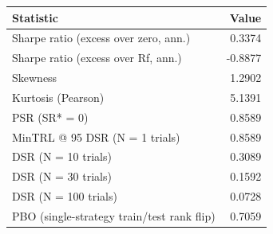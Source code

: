 \begin{tabular}{lr}
\toprule
Statistic & Value \\
\midrule
Sharpe ratio (excess over zero, ann.) & 0.3374 \\
Sharpe ratio (excess over Rf, ann.) & -0.8877 \\
Skewness & 1.2902 \\
Kurtosis (Pearson) & 5.1391 \\
PSR (SR* = 0) & 0.8589 \\
MinTRL @ 95%
DSR (N = 1 trials) & 0.8589 \\
DSR (N = 10 trials) & 0.3089 \\
DSR (N = 30 trials) & 0.1592 \\
DSR (N = 100 trials) & 0.0728 \\
PBO (single-strategy train/test rank flip) & 0.7059 \\
\bottomrule
\end{tabular}
